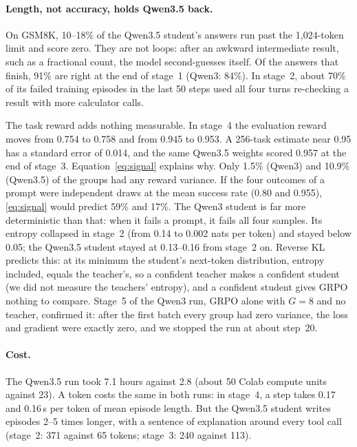 \documentclass[11pt,a4paper]{article}
\begin{document}
\paragraph{Length, not accuracy, holds Qwen3.5 back.}
On GSM8K, 10--18\% of the Qwen3.5 student's answers run past the
1{,}024-token limit and score zero. They are not loops: after an awkward
intermediate result, such as a fractional count, the model second-guesses
itself. Of the answers that finish, 91\% are right at the end of stage~1
(Qwen3: 84\%). In stage~2, about 70\% of its failed training episodes in the
last 50 steps used all four turns re-checking a result with more calculator
calls.

\begin{findbox}{The task reward adds nothing measurable.}
In stage~4 the evaluation reward moves from 0.754 to 0.758 and from 0.945 to
0.953. A 256-task estimate near 0.95 has a standard error of 0.014, and the
same Qwen3.5 weights scored 0.957 at the end of stage~3.
Equation~\eqref{eq:signal} explains why. Only 1.5\% (Qwen3) and 10.9\%
(Qwen3.5) of the groups had any reward variance. If the four outcomes of a
prompt were independent draws at the mean success rate (0.80 and 0.955),
\eqref{eq:signal} would predict 59\% and 17\%. The Qwen3 student is far more
deterministic than that: when it fails a prompt, it fails all four samples.
Its entropy collapsed in stage~2 (from 0.14 to 0.002 nats per token) and
stayed below 0.05; the Qwen3.5 student stayed at 0.13--0.16 from stage~2 on. Reverse
KL predicts this: at its minimum the student's next-token distribution,
entropy included, equals the teacher's, so a confident teacher makes a
confident student (we did not measure the teachers' entropy), and a
confident student gives GRPO nothing to compare. Stage~5 of the Qwen3 run,
GRPO alone with $G=8$ and no teacher, confirmed it: after the first batch
every group had zero variance, the loss and gradient were exactly zero, and
we stopped the run at about step~20.
\end{findbox}

\paragraph{Cost.}
The Qwen3.5 run took 7.1 hours against 2.8 (about 50 Colab compute units
against 23). A token costs the same in both runs: in stage~4, a step takes
0.17 and 0.16\,s per token of mean episode length. But the Qwen3.5 student
writes episodes 2--5 times longer, with a sentence of explanation around
every tool call (stage~2: 371 against 65 tokens; stage~3: 240 against 113).
\end{document}
